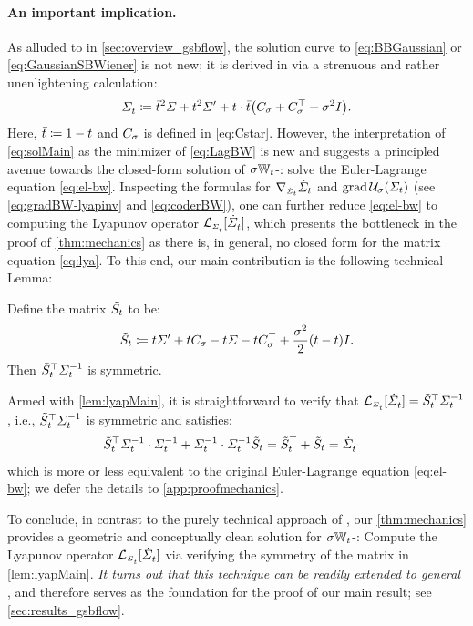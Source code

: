 \paragraph{An important implication.}
As alluded to in \cref{sec:overview_gsbflow}, the solution curve to \eqref{eq:BBGaussian} or \eqref{eq:GaussianSBWiener} is not new; it is derived in \citet{mallasto2021entropy} via a strenuous and rather unenlightening calculation:
\begin{equation}
\label{eq:solMain}
\Sigmasol \defeq \ctimebar^2 \Sigma + \ctime^2 \Sigma' + \ctime\cdot\ctimebar\parens*{\C+\C^\top+ \sigma^2 \eye}.
\end{equation}
Here, $\bar{t} \coloneqq 1-t$ and $C_{\sigma}$ is defined in \eqref{eq:Cstar}. However, the interpretation of \eqref{eq:solMain} as the minimizer of \eqref{eq:LagBW} is new and suggests a principled avenue towards the closed-form solution of $\sigma\mathbb{W}_{t}$-: solve the Euler-Lagrange equation \eqref{eq:el-bw}.
Inspecting the formulas for $\nabla_{\scriptscriptstyle\dot{\Sigma}_{t}}\dot{\Sigma}_{t}$ and $\gradBW \penergyBW$ (see \eqref{eq:gradBW-lyapinv} and \eqref{eq:coderBW}), one can further reduce \eqref{eq:el-bw} to computing the Lyapunov operator $\lyap$, which presents the bottleneck in the proof of \cref{thm:mechanics} as there is, in general, no closed form for the matrix equation \eqref{eq:lya}. To this end, our main contribution is the following technical Lemma:
\begin{lemma}\label{lem:lyapMain}
Define the matrix $\tilde{S_{t}}$ to be:
\begin{equation}
\label{eq:HtMain}
\tilde{S}_{t} \coloneqq t\Sigma' + \bar{t} C_{\sigma} - \bar{t}\Sigma - tC_{\sigma}^\top + \frac{\sigma^2}{2}(\bar{t}-t)I.
\end{equation}Then $\tilde{S}_{t}^\top\Sigma^{-1}_{ t }$ is symmetric.
\end{lemma}
Armed with \cref{lem:lyapMain}, it is straightforward to verify that $\lyap = \Ht^\top\Sigmasolinv$, i.e., $\tilde{S}_{t}^\top \Sigma^{-1}_{ t }$ is symmetric and satisfies:
\begin{align}
   \tilde{S}_{t}^\top\Sigma^{-1}_{ t } \cdot \Sigma^{-1}_{ t } + \Sigma^{-1}_{ t } \cdot\Sigma^{-1}_{ t } \tilde{S}_{t} &= \tilde{S}_{t}^\top +  \tilde{S}_{t}= \dot{\Sigma}^{}_{ t }
\end{align}which is more or less equivalent to the original Euler-Lagrange equation \eqref{eq:el-bw}; we defer the details to \cref{app:proofmechanics}.


To conclude, in contrast to the purely technical approach of \citet{mallasto2021entropy}, our \cref{thm:mechanics} provides a geometric and conceptually clean solution for $\sigma\mathbb{W}_{t}$-: Compute the Lyapunov operator $\lyap$ via verifying the symmetry of the matrix in \cref{lem:lyapMain}. \emph{It turns out that this technique can be readily extended to general }, and therefore serves as the foundation for the proof of our main result; see \cref{sec:results_gsbflow}.



